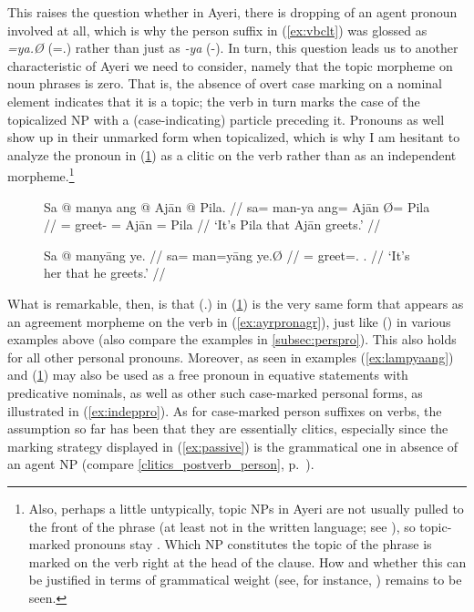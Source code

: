 This raises the question whether in Ayeri, there is dropping of an agent
pronoun involved at all, which is why the person suffix in (\ref{ex:vbclt}) was
glossed as \emph{=ya.Ø} (\mbox{=\TsgM{}.\Top{}}) rather than just as \emph{-ya}
(-\TsgM{}). In turn, this question leads us to another characteristic of Ayeri
we need to consider, namely that the topic morpheme on noun phrases is zero.
That is, the absence of overt case marking on a nominal element indicates that
it is a topic; the verb in turn marks the case of the topicalized NP with a
(case-indicating) particle preceding it. Pronouns as well show up in their
unmarked form when topicalized, which is why I am hesitant to analyze the
pronoun in (\ref{ex:protop}) as a clitic on the verb rather than as an
independent morpheme.\footnote{Also, perhaps a little untypically, topic NPs in
Ayeri are not usually pulled to the front of the phrase (at least not in the
written language; see \cite[120--122]{lehmann2015}), so topic-marked pronouns
stay . Which NP constitutes the topic of the phrase is marked on
the verb right at the head of the clause. How and whether this can be justified
in terms of grammatical weight (see, for instance, \cite[95--98]{wasow1997})
remains to be seen.}

\begin{figure}[h]
\pex %
\a\label{ex:fullsntc}\begingl
	\gla Sa @ manya ang @ Ajān {} @ Pila. //
	\glb sa= man-ya ang= ​Ajān Ø= ​Pila //
	\glc \PatT{}= greet-\TsgM{} \Aarg{}= ​Ajān \Top{}= ​Pila //
	\glft `It's Pila that Ajān greets.' //
\endgl

\a\label{ex:protop}\begingl
	\gla Sa @ manyāng ye. //
	\glb sa= man=yāng ye.Ø //
	\glc \PatT{}= greet=\TsgM{}.\Aarg{} \TsgF{}.\Top{} //
	\glft `It's her that he greets.' //
\endgl
\xe
\end{figure}

\label{patagr}
What is remarkable, then, is that  (\TsgF{}.\Top{}) in
(\ref{ex:protop}) is the very same form that appears as an agreement morpheme
on the verb in (\ref{ex:ayrpronagr}), just like  (\TsgM{}) in
various examples above (also compare the examples in \autoref{subsec:perspro}).
This also holds for all other personal pronouns. Moreover, 
 as seen in examples (\ref{ex:lampyaang}) and 
(\ref{ex:protop}) may also be used as a free pronoun in equative statements
with predicative nominals, as well as other such case-marked personal forms, as
illustrated in (\ref{ex:indeppro}). As for case-marked person suffixes on
verbs, the assumption so far has been that they are essentially clitics,
especially since the marking strategy displayed in (\ref{ex:passive}) is the
grammatical one in absence of an agent NP (compare
\autoref{clitics_postverb_person}, p.~\pageref{clitics_postverb_person}).

